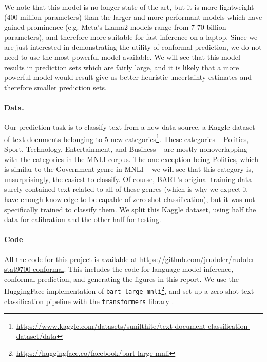 \documentclass[a4paper, 12pt]{article}
\begin{document}
We note that this model is no longer state of the art, but it is more lightweight (400 million parameters) than the larger and more performant models which have gained prominence (e.g. Meta's Llama2 models range from 7-70 billion parameters), and therefore more suitable for fast inference on a laptop.
Since we are just interested in demonstrating the utility of conformal prediction, we do not need to use the most powerful model available.
We will see that this model results in prediction sets which are fairly large, and it is likely that a more powerful model would result give us better heuristic uncertainty estimates and therefore smaller prediction sets.


\paragraph*{Data.} Our prediction task is to classify text from a new data source, a Kaggle dataset of text documents belonging to 5 new categories\footnote{\url{https://www.kaggle.com/datasets/sunilthite/text-document-classification-dataset/data}}. These categories -- Politics, Sport, Technology, Entertainment, and Business -- are mostly nonoverlapping with the categories in the MNLI corpus. The one exception being Politics, which is similar to the Government genre in MNLI -- we will see that this category is, unsurprisingly, the easiest to classify. Of course, BART's original training data surely contained text related to all of these genres (which is why we expect it have enough knowledge to be capable of zero-shot classification), but it was not specifically trained to classify them. We split this Kaggle dataset, using half the data for calibration and the other half for testing.

\paragraph*{Code} All the code for this project is available at \url{https://github.com/jrudoler/rudoler-stat9700-conformal}. This includes the code for language model inference, conformal prediction, and generating the figures in this report. We use the HuggingFace implementation of \texttt{bart-large-mnli}\footnote{\url{https://huggingface.co/facebook/bart-large-mnli}}, and set up a zero-shot text classification pipeline with the \texttt{transformers} library \autocite{wolfHuggingFaceTransformersStateoftheart2019}.
\end{document}
